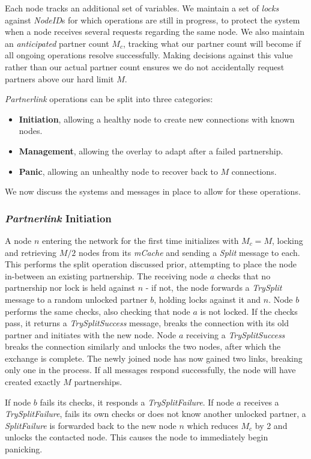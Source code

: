 \documentclass[12pt,a4paper]{article}
\begin{document}
Each node tracks an additional set of variables. We maintain a set of \textit{locks} against \textit{NodeID}s for which operations are still in progress, to protect the system when a node receives several requests regarding the same node. We also maintain an \textit{anticipated} partner count \(M_c\), tracking what our partner count will become if all ongoing operations resolve successfully. Making decisions against this value rather than our actual partner count ensures we do not accidentally request partners above our hard limit \(M\).

\textit{Partnerlink} operations can be split into three categories:
\begin{itemize}
	\item \textbf{Initiation}, allowing a healthy node to create new connections with known nodes.
	\item \textbf{Management}, allowing the overlay to adapt after a failed partnership.
	\item \textbf{Panic}, allowing an unhealthy node to recover back to \(M\) connections.
\end{itemize}
We now discuss the systems and messages in place to allow for these operations.

\subsubsection{\textit{Partnerlink} Initiation}
A node \(n\) entering the network for the first time initializes with \(M_c = M\), locking and retrieving \(M / 2\) nodes from its \textit{mCache} and sending a \textit{Split} message to each. This performs the split operation discussed prior, attempting to place the node in-between an existing partnership. The receiving node \(a\) checks that no partnership nor lock is held against \(n\) - if not, the node forwards a \textit{TrySplit} message to a random unlocked partner \(b\), holding locks against it and \(n\). Node \(b\) performs the same checks, also checking that node \(a\) is not locked. If the checks pass, it returns a \textit{TrySplitSuccess} message, breaks the connection with its old partner and initiates with the new node. Node \(a\) receiving a \textit{TrySplitSuccess} breaks the connection similarly and unlocks the two nodes, after which the exchange is complete. The newly joined node has now gained two links, breaking only one in the process. If all messages respond successfully, the node will have created exactly \(M\) partnerships.

If node \(b\) fails its checks, it responds a \textit{TrySplitFailure}. If node \(a\) receives a \textit{TrySplitFailure}, fails its own checks or does not know another unlocked partner, a \textit{SplitFailure} is forwarded back to the new node \(n\) which reduces \(M_c\) by 2 and unlocks the contacted node. This causes the node to immediately begin panicking.
\end{document}
